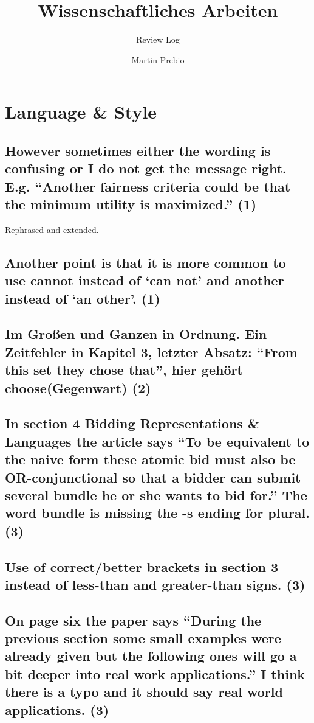 \documentclass{"../../Datenanalyse/assignments/latex-brookesassignment/brookes-assignment"}
\author{Martin Prebio}
\title{Wissenschaftliches Arbeiten}
\subtitle{Review Log}
\begin{document}
\maketitle


\section{Language \& Style}
\subsection{However sometimes either the wording is confusing or I do not get the message right. E.g. ``Another fairness criteria could be that the minimum utility is maximized.'' (1)}
Rephrased and extended.
\subsection{Another point is that it is more common to use cannot instead of `can not' and another instead of `an other'. (1)}
\subsection{Im Großen und Ganzen in Ordnung. Ein Zeitfehler in Kapitel 3, letzter Absatz: ``From this set they chose that'', hier gehört choose(Gegenwart) (2)}
\subsection{In section 4 Bidding Representations \& Languages the article says ``To be equivalent to the naive form these atomic bid must also be OR-conjunctional so that a bidder can submit several bundle he or she wants to bid for.'' The word bundle is missing the -s ending for plural. (3)}
\subsection{Use of correct/better brackets in section 3 instead of less-than and greater-than signs. (3)}
\subsection{On page six the paper says ``During the previous section some small examples were already given but the following ones will go a bit deeper into real work applications.'' I think there is a typo and it should say real world applications. (3)}
\end{document}
